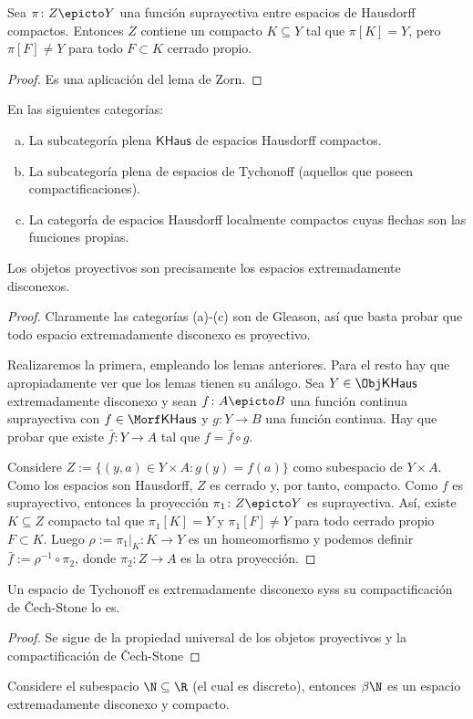 \documentclass[topologia-analisis.tex]{subfiles}
\begin{document}
\begin{lem}
	Sea $\pi\colon Z \epicto Y$ una función suprayectiva entre espacios de Hausdorff compactos.
	Entonces $Z$ contiene un compacto $K \subseteq Y$ tal que $\pi[K] = Y$, pero $\pi[F] \ne Y$ para todo $F \subset K$ cerrado propio.
\end{lem}
\begin{proof}
	Es una aplicación del lema de Zorn.
\end{proof}

\begin{thm}
	En las siguientes categorías:
	\begin{enumerate}[(a)]
		\item La subcategoría plena $\mathsf{KHaus}$ de espacios Hausdorff compactos.
		\item La subcategoría plena de espacios de Tychonoff (aquellos que poseen compactificaciones).
		\item La categoría de espacios Hausdorff localmente compactos cuyas flechas son las funciones propias.
	\end{enumerate}
	Los objetos proyectivos son precisamente los espacios extremadamente disconexos.
\end{thm}
\begin{proof}
	Claramente las categorías (a)-(c) son de Gleason, así que basta probar que todo espacio extremadamente disconexo es proyectivo.

	Realizaremos la primera, empleando los lemas anteriores. Para el resto hay que apropiadamente ver que los lemas tienen su análogo.
	Sea $Y \in \Obj\mathsf{KHaus}$ extremadamente disconexo y sean $f\colon A \epicto B$ una función continua suprayectiva con $f \in \Morf\mathsf{KHaus}$
	y $g \colon Y \to B$ una función continua.
	Hay que probar que existe $\bar f \colon Y \to A$ tal que $f = \bar f \circ g$.

	Considere $Z := \{ (y, a) \in Y \times A : g(y) = f(a) \}$ como subespacio de $Y\times A$.
	Como los espacios son Hausdorff, $Z$ es cerrado y, por tanto, compacto.
	Como $f$ es suprayectivo, entonces la proyección $\pi_1 \colon Z \epicto Y$ es suprayectiva.
	Así, existe $K \subseteq Z$ compacto tal que $\pi_1[K] = Y$ y $\pi_1[F] \ne Y$ para todo cerrado propio $F \subset K$.
	Luego $\rho := \pi_1|_K \colon K \to Y$ es un homeomorfismo y podemos definir $\bar f := \rho^{-1} \circ \pi_2$,
	donde $\pi_2 \colon Z \to A$ es la otra proyección.
\end{proof}

\begin{cor}
	Un espacio de Tychonoff es extremadamente disconexo syss su compactificación de \v Cech-Stone lo es.
\end{cor}
\begin{proof}
	Se sigue de la propiedad universal de los objetos proyectivos y la compactificación de \v Cech-Stone
\end{proof}
\begin{ex}
	Considere el subespacio $\N \subseteq \R$ (el cual es discreto), entonces $\beta\N$ es un espacio extremadamente disconexo y compacto.
\end{ex}
\end{document}
